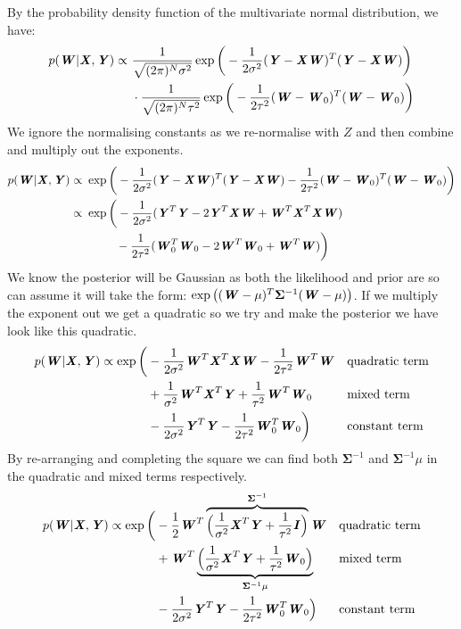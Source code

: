 \documentclass{article}
\newcommand{\mat}[1]{\textbf{\textit{#1}}}
\begin{document}
By the probability density function of the multivariate normal distribution, we have:
\begin{align*}
	p(\mat{W}|\mat{X},\mat{Y}) \propto\ &\frac{1}{\sqrt{(2\pi)^N\sigma^2}}\exp\bigg(-\frac{1}{2\sigma^2}(\mat{Y}-\mat{X}\mat{W})^T(\mat{Y}-\mat{X}\mat{W})\bigg) \\
	&\cdot \frac{1}{\sqrt{(2\pi)^N\tau^2}}\exp\bigg(-\frac{1}{2\tau^2}(\mat{W}-\mat{W}_0)^T(\mat{W}-\mat{W}_0)\bigg) \\
\end{align*}
We ignore the normalising constants as we re-normalise with $Z$ and then combine and multiply out the exponents.
\begin{align*}
	p(\mat{W}|\mat{X},\mat{Y}) \propto\ &\exp\bigg(-\frac{1}{2\sigma^2}(\mat{Y}-\mat{X}\mat{W})^T(\mat{Y}-\mat{X}\mat{W})-\frac{1}{2\tau^2}(\mat{W}-\mat{W}_0)^T(\mat{W}-\mat{W}_0)\bigg) \\
	\propto\ &\exp\bigg(-\frac{1}{2\sigma^2}(\mat{Y}^T\mat{Y}-2\mat{Y}^T\mat{X}\mat{W}+\mat{W}^T\mat{X}^T\mat{X}\mat{W}) \\
	&\hspace{2.5em}-\frac{1}{2\tau^2}(\mat{W}_0^T\mat{W}_0-2\mat{W}^T\mat{W}_0+\mat{W}^T\mat{W})\bigg)
\end{align*}
We know the posterior will be Gaussian as both the likelihood and prior are so can assume it will take the form: $\exp\big((\mat{W}-\mu)^T\mathbf{\Sigma}^{-1}(\mat{W}-\mu)\big)$. If we multiply the exponent out we get a quadratic so we try and make the posterior we have look like this quadratic.
\begin{align*}
	p(\mat{W}|\mat{X},\mat{Y}) \propto \exp\bigg(&-\frac{1}{2\sigma^2}\mat{W}^T\mat{X}^T\mat{X}\mat{W}-\frac{1}{2\tau^2}\mat{W}^T\mat{W}	&&\mbox{quadratic term}\\
	&+\frac{1}{\sigma^2}\mat{W}^T\mat{X}^T\mat{Y}+\frac{1}{\tau^2}\mat{W}^T\mat{W}_0							&&\mbox{mixed term}\\
	&-\frac{1}{2\sigma^2}\mat{Y}^T\mat{Y}-\frac{1}{2\tau^2}\mat{W}_0^T\mat{W}_0\bigg)							&&\mbox{constant term}\\
\end{align*}
By re-arranging and completing the square we can find both $\mathbf{\Sigma}^{-1}$ and $\mathbf{\Sigma}^{-1}\mu$ in the quadratic and mixed terms respectively.
\begin{align*}
	p(\mat{W}|\mat{X},\mat{Y}) \propto \exp\bigg(&-\frac{1}{2}\mat{W}^T\overbrace{\Big(\frac{1}{\sigma^2}\mat{X}^T\mat{Y}+\frac{1}{\tau^2}\mat{I}\Big)}^{\mathbf{\Sigma}^{-1}}\mat{W}	&&\mbox{quadratic term}\\
	&+\mat{W}^T\underbrace{\Big(\frac{1}{\sigma^2}\mat{X}^T\mat{Y}+\frac{1}{\tau^2}\mat{W}_0\Big)}_{\mathbf{\Sigma}^{-1}\mu}						&&\mbox{mixed term}\\
	&-\frac{1}{2\sigma^2}\mat{Y}^T\mat{Y}-\frac{1}{2\tau^2}\mat{W}_0^T\mat{W}_0\Big)								&&\mbox{constant term}\\
\end{align*}
\end{document}
